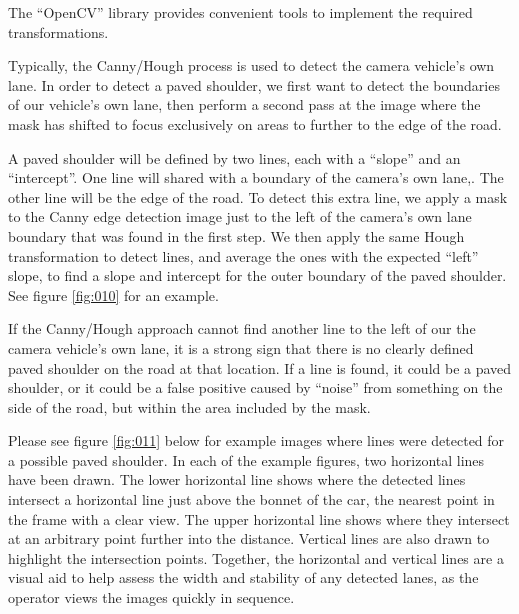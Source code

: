 \documentclass[11pt,twoside]{report}
\begin{document}
The ``OpenCV'' library provides convenient tools to implement the required transformations.

Typically, the Canny/Hough process is used to detect the camera vehicle's own lane.  In order to detect a paved shoulder, we first want to detect the boundaries of our vehicle's own lane, then perform a second pass at the image where the mask has shifted to focus exclusively on areas to further to the edge of the road.

A paved shoulder will be defined by two lines, each with a ``slope'' and an ``intercept''.  One line will shared with a boundary of the camera's own lane,.  The other line will be the edge of the road.  To detect this extra line, we apply a mask to the Canny edge detection image just to the left of the camera's own lane boundary that was found in the first step.  We then apply the same Hough transformation to detect lines, and average the ones with the expected ``left'' slope, to find a slope and intercept for the outer boundary of the paved shoulder.  See figure \ref{fig:010} for an example.

If the Canny/Hough approach cannot find another line to the left of our the camera vehicle's own lane, it is a strong sign that there is no clearly defined paved shoulder on the road at that location.  If a line is found, it could be a paved shoulder, or it could be a false positive caused by ``noise'' from something on the side of the road, but within the area included by the mask.

Please see figure \ref{fig:011} below for example images where lines were detected for a possible paved shoulder.  In each of the example figures, two horizontal lines have been drawn.  The lower horizontal line shows where the detected lines intersect a horizontal line just above the bonnet of the car, the nearest point in the frame with a clear view.  The upper horizontal line shows where they intersect at an arbitrary point further into the distance.  Vertical lines are also drawn to highlight the intersection points.  Together, the horizontal and vertical lines are a visual aid to help assess the width and stability of any detected lanes, as the operator views the images quickly in sequence.
\end{document}
